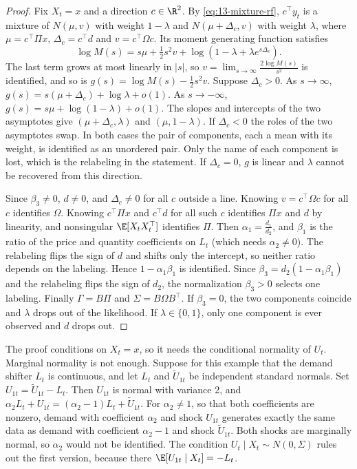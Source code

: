 \begin{proof}
Fix $X_t = x$ and a direction $c \in \R^2$. By \eqref{eq:13-mixture-rf}, $c^\top y_t$ is a mixture of
$N(\mu, v)$ with weight $1-\lambda$ and $N(\mu + \Delta_c, v)$ with weight $\lambda$, where $\mu = c^\top \Pi x$,
$\Delta_c = c^\top d$ and $v = c^\top\Omega c$. Its moment generating function satisfies
\begin{equation*}
  \log M(s) = s\mu + \tfrac{1}{2}s^2 v + \log\left(1 - \lambda + \lambda e^{s\Delta_c}\right).
\end{equation*}
The last term grows at most linearly in $|s|$, so $v = \lim_{s\to\infty}\frac{2\log M(s)}{s^2}$ is identified, and so
is $g(s) = \log M(s) - \frac{1}{2}s^2 v$. Suppose $\Delta_c > 0$. As $s \to \infty$,
$g(s) = s(\mu + \Delta_c) + \log\lambda + o(1)$. As $s \to -\infty$, $g(s) = s\mu + \log(1 - \lambda) + o(1)$. The
slopes and intercepts of the two asymptotes give $(\mu + \Delta_c, \lambda)$ and $(\mu, 1 - \lambda)$. If
$\Delta_c < 0$ the roles of the two asymptotes swap. In both cases the pair of components, each a mean with its
weight, is identified as an unordered pair. Only the name of each component is lost, which is the relabeling in the
statement. If $\Delta_c = 0$, $g$ is linear and $\lambda$ cannot be recovered from this direction.

Since $\beta_3 \ne 0$, $d \ne 0$, and $\Delta_c \ne 0$ for all $c$ outside a line. Knowing $v = c^\top\Omega c$ for
all $c$ identifies $\Omega$. Knowing $c^\top\Pi x$ and $c^\top d$ for all such $c$ identifies $\Pi x$ and $d$ by
linearity, and nonsingular $\E[X_tX_t^\top]$ identifies $\Pi$. Then $\alpha_1 = \frac{d_1}{d_2}$, and $\beta_1$ is the
ratio of the price and quantity coefficients on $L_t$ (which needs $\alpha_2 \ne 0$). The relabeling flips the sign
of $d$ and shifts only the intercept, so neither ratio depends on the labeling. Hence $1 - \alpha_1\beta_1$ is
identified. Since $\beta_3 = d_2(1 - \alpha_1\beta_1)$ and the relabeling flips the sign of $d_2$, the
normalization $\beta_3 > 0$ selects one labeling. Finally $\Gamma = B\Pi$ and $\Sigma = B\Omega B^\top$. If $\beta_3 = 0$, the two
components coincide and $\lambda$ drops out of the likelihood. If $\lambda \in \{0,1\}$, only one component is ever
observed and $d$ drops out.
\end{proof}

The proof conditions on $X_t = x$, so it needs the conditional normality of $U_t$. Marginal normality is not
enough. Suppose for this example that the demand shifter $L_t$ is continuous, and let $L_t$ and $\tilde U_{1t}$ be
independent standard normals. Set $U_{1t} = \tilde U_{1t} - L_t$. Then $U_{1t}$ is normal with variance 2, and
$\alpha_2 L_t + U_{1t} = (\alpha_2 - 1)L_t + \tilde U_{1t}$. For $\alpha_2 \ne 1$, so that both coefficients are
nonzero, demand with coefficient $\alpha_2$ and shock $U_{1t}$ generates exactly the same data as demand with coefficient $\alpha_2 - 1$
and shock $\tilde U_{1t}$. Both shocks are marginally normal, so $\alpha_2$ would not be identified. The condition
$U_t \mid X_t \sim N(0,\Sigma)$ rules out the first version, because there $\E[U_{1t} \mid X_t] = -L_t$.

